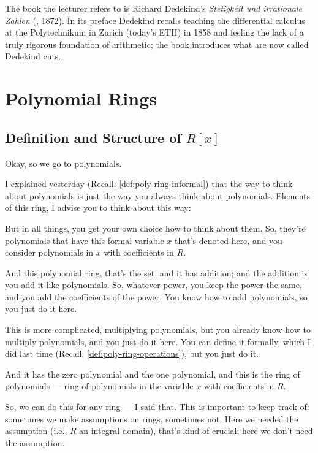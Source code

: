 \begin{aiNote}
The book the lecturer refers to is Richard Dedekind's \emph{Stetigkeit und irrationale Zahlen} (, 1872). In its preface Dedekind recalls teaching the differential calculus at the Polytechnikum in Zurich (today's ETH) in 1858 and feeling the lack of a truly rigorous foundation of arithmetic; the book introduces what are now called Dedekind cuts.
\end{aiNote}

\section{Polynomial Rings}

\subsection{Definition and Structure of \texorpdfstring{$R[x]$}{R[x]}}

\begin{speech}[00:04:45 - 00:06:30]
Okay, so we go to polynomials.

I explained yesterday (Recall: \cref{def:poly-ring-informal}) that the way to think about polynomials is just the way you always think about polynomials. Elements of this ring, I advise you to think about this way: 

But in all things, you get your own choice how to think about them. So, they're polynomials that have this formal variable $x$ that's denoted here, and you consider polynomials in $x$ with coefficients in $R$.

And this polynomial ring, that's the set, and it has addition; and the addition is you add it like polynomials. So, whatever power, you keep the power the same, and you add the coefficients of the power. You know how to add polynomials, so you just do it here.

This is more complicated, multiplying polynomials, but you already know how to multiply polynomials, and you just do it here. You can define it formally, which I did last time (Recall: \cref{def:poly-ring-operations}), but you just do it.

And it has the zero polynomial and the one polynomial, and this is the ring of polynomials  --- ring of polynomials in the variable $x$ with coefficients in $R$.

So, we can do this for any ring --- I said that. This is important to keep track of: sometimes we make assumptions on rings, sometimes not. Here we needed the assumption (i.e., $R$ an integral domain), that's kind of crucial; here we don't need the assumption.
\end{speech}

